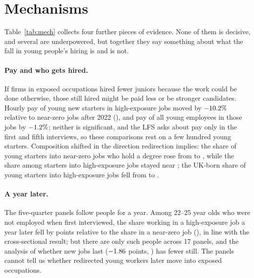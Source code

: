 \documentclass[11pt]{article}
\begin{document}
\section{Mechanisms}\label{sec:mech}

Table~\ref{tab:mech} collects four further pieces of evidence. None of them is decisive, and several are underpowered, but together they say something about what the fall in young people's hiring is and is not.

\paragraph{Pay and who gets hired.} If firms in exposed occupations hired fewer juniors because the work could be done otherwise, those still hired might be paid less or be stronger candidates. Hourly pay of young new starters in high-exposure jobs moved by $-10.2\%$ relative to near-zero jobs after 2022 (\wageYoungNewP), and pay of all young employees in those jobs by $-1.2\%$; neither is significant, and the LFS asks about pay only in the first and fifth interviews, so these comparisons rest on a few hundred young starters. Composition shifted in the direction redirection implies: the share of young starters into near-zero jobs who hold a degree rose from \compZeroDegPre{} to \compZeroDegPost, while the share among starters into high-exposure jobs stayed near \compHighDegPost; the UK-born share of young starters into high-exposure jobs fell from \compHighUKPre{} to \compHighUKPost.

\paragraph{A year later.} The five-quarter panels follow people for a year. Among 22--25 year olds who were not employed when first interviewed, the share working in a high-exposure job a year later fell by \persEntryAbs{} points relative to the share in a near-zero job (\persEntryP), in line with the cross-sectional result; but there are only \persN{} such people across 17 panels, and the analysis of whether new jobs last ($-1.86$ points, \persSurviveP) has fewer still. The panels cannot tell us whether redirected young workers later move into exposed occupations.
\end{document}
